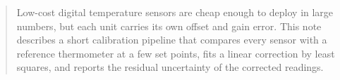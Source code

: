 \begin{abstract}
Low-cost digital temperature sensors are cheap enough to deploy in large
numbers, but each unit carries its own offset and gain error. This note
describes a short calibration pipeline that compares every sensor with a
reference thermometer at a few set points, fits a linear correction by least
squares, and reports the residual uncertainty of the corrected readings.
\end{abstract}
